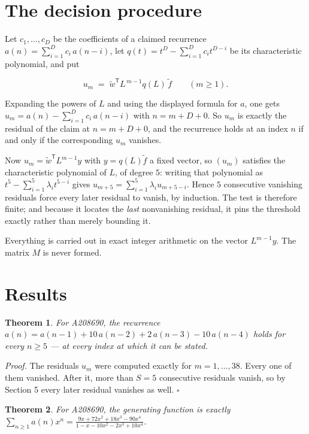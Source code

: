 \documentclass[11pt]{article}
\newtheorem{theorem}{Theorem}
\theoremstyle{definition}
\begin{document}
\section{The decision procedure}

Let $c_1,\dots,c_D$ be the coefficients of a claimed recurrence $a(n) = \sum_{i=1}^{D} c_i\,a(n-i)$, let $q(t) = t^{D} - \sum_{i=1}^{D} c_i t^{D-i}$ be its characteristic polynomial, and put

\[u_m \;=\; \tilde w^{\mathsf T} L^{\,m-1} q(L)\,\tilde f \qquad (m \ge 1).\]

Expanding the powers of $L$ and using the displayed formula for $a$, one gets $u_m = a(n) - \sum_{i=1}^{D} c_i\,a(n-i)$ with $n = m + D + 0$. So $u_m$ is exactly the residual of the claim at $n = m + D + 0$, and the recurrence holds at an index $n$ if and only if the corresponding $u_m$ vanishes.

Now $u_m = \tilde w^{\mathsf T} L^{m-1} y$ with $y = q(L)\tilde f$ a fixed vector, so $(u_m)$ satisfies the characteristic polynomial of $L$, of degree $5$: writing that polynomial as $t^{5} - \sum_{i=1}^{5} \lambda_i t^{5-i}$ gives $u_{m+5} = \sum_{i=1}^{5} \lambda_i u_{m+5-i}$. Hence $5$ consecutive vanishing residuals force every later residual to vanish, by induction. The test is therefore finite; and because it locates the {\itshape last} nonvanishing residual, it pins the threshold exactly rather than merely bounding it.

Everything is carried out in exact integer arithmetic on the vector $L^{m-1}y$. The matrix $M$ is never formed.

\section{Results}

\begin{theorem} For A208690, the recurrence $a(n) = a(n-1) + 10\,a(n-2) + 2\,a(n-3) - 10\,a(n-4)$ holds for every $n \ge 5$ --- at every index at which it can be stated.\end{theorem}

{\itshape Proof.} The residuals $u_m$ were computed exactly for $m = 1,\dots,38$. Every one of them vanished. After it, more than $S = 5$ consecutive residuals vanish, so by Section 5 every later residual vanishes as well. $\square$

\begin{theorem} For A208690, the generating function is exactly $\sum_{n\ge 1} a(n)x^n = \frac{9x + 72x^{2} + 18x^{3} - 90x^{4}}{1 - x - 10x^{2} - 2x^{3} + 10x^{4}}$.\end{theorem}
\end{document}
